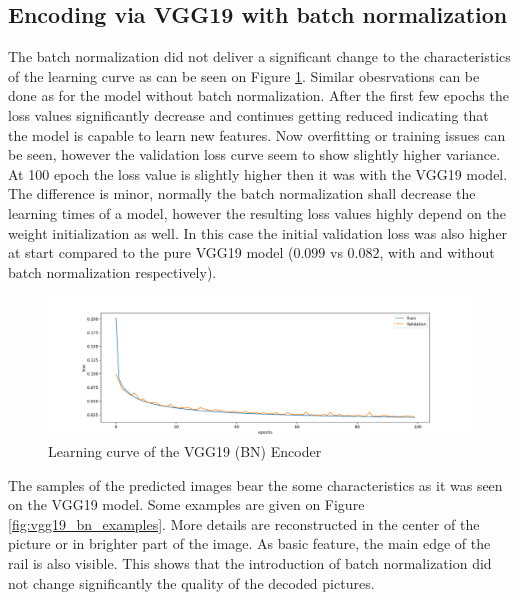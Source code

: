 \subsection{Encoding via VGG19 with batch normalization}
The batch normalization did not deliver a significant change to the characteristics of the learning
curve as can be seen on Figure \ref{fig:vgg19_bn_learning_curve}.
Similar obesrvations can be done as for the model without batch normalization.
After the first few epochs the loss values significantly decrease and continues getting reduced
indicating that the model is capable to learn new features.
Now overfitting or training issues can be seen, however the validation loss curve seem to show
slightly higher variance.
At 100 epoch the loss value is slightly higher then it was with the VGG19 model.
The difference is minor, normally the batch normalization shall decrease the learning times of a model,
however the resulting loss values highly depend on the weight initialization as well.
In this case the initial validation loss was also higher at start compared to the pure VGG19 model
($0.099$ vs $0.082$, with and without batch normalization respectively).

\begin{figure}[!ht]
    \centering
    \includegraphics[width=\textwidth,trim={0 0 0 1cm},clip]{./results/vgg19_bn_vgg19/20230525_045131_results.png}
    \caption{Learning curve of the VGG19 (BN) Encoder}
    \label{fig:vgg19_bn_learning_curve}
\end{figure}

The samples of the predicted images bear the some characteristics as it was seen on the VGG19 model.
Some examples are given on Figure \ref{fig:vgg19_bn_examples}.
More details are reconstructed in the center of the picture or in brighter part of the image.
As basic feature, the main edge of the rail is also visible.
This shows that the introduction of batch normalization did not change significantly the quality of
the decoded pictures.

